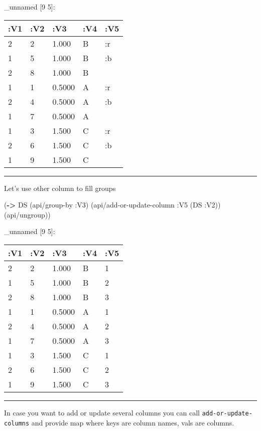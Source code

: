\documentclass[]{article}
\newenvironment{Shaded}{\begin{snugshade}}{\end{snugshade}}
\newcommand{\KeywordTok}[1]{\textcolor[rgb]{0.13,0.29,0.53}{\textbf{#1}}}
\newcommand{\DecValTok}[1]{\textcolor[rgb]{0.00,0.00,0.81}{#1}}
\newcommand{\VariableTok}[1]{\textcolor[rgb]{0.00,0.00,0.00}{#1}}
\newcommand{\AttributeTok}[1]{\textcolor[rgb]{0.77,0.63,0.00}{#1}}
\newcommand{\NormalTok}[1]{#1}
\begin{document}
\_unnamed {[}9 5{]}:

\begin{longtable}[]{@{}lllll@{}}
\toprule
:V1 & :V2 & :V3 & :V4 & :V5\tabularnewline
\midrule
\endhead
2 & 2 & 1.000 & B & :r\tabularnewline
1 & 5 & 1.000 & B & :b\tabularnewline
2 & 8 & 1.000 & B &\tabularnewline
1 & 1 & 0.5000 & A & :r\tabularnewline
2 & 4 & 0.5000 & A & :b\tabularnewline
1 & 7 & 0.5000 & A &\tabularnewline
1 & 3 & 1.500 & C & :r\tabularnewline
2 & 6 & 1.500 & C & :b\tabularnewline
1 & 9 & 1.500 & C &\tabularnewline
\bottomrule
\end{longtable}

\begin{center}\rule{0.5\linewidth}{0.5pt}\end{center}

Let's use other column to fill groups

\begin{Shaded}
\begin{Highlighting}[]
\NormalTok{(}\KeywordTok{->}\NormalTok{ DS}
\NormalTok{    (api/group-by }\AttributeTok{:V3}\NormalTok{)}
\NormalTok{    (api/add-or-update-column }\AttributeTok{:V5}\NormalTok{ (DS }\AttributeTok{:V2}\NormalTok{))}
\NormalTok{    (api/ungroup))}
\end{Highlighting}
\end{Shaded}

\_unnamed {[}9 5{]}:

\begin{longtable}[]{@{}lllll@{}}
\toprule
:V1 & :V2 & :V3 & :V4 & :V5\tabularnewline
\midrule
\endhead
2 & 2 & 1.000 & B & 1\tabularnewline
1 & 5 & 1.000 & B & 2\tabularnewline
2 & 8 & 1.000 & B & 3\tabularnewline
1 & 1 & 0.5000 & A & 1\tabularnewline
2 & 4 & 0.5000 & A & 2\tabularnewline
1 & 7 & 0.5000 & A & 3\tabularnewline
1 & 3 & 1.500 & C & 1\tabularnewline
2 & 6 & 1.500 & C & 2\tabularnewline
1 & 9 & 1.500 & C & 3\tabularnewline
\bottomrule
\end{longtable}

\begin{center}\rule{0.5\linewidth}{0.5pt}\end{center}

In case you want to add or update several columns you can call
\texttt{add-or-update-columns} and provide map where keys are column
names, vals are columns.

\begin{Shaded}
\end{Shaded}
\end{document}
